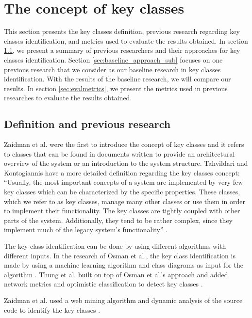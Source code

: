 \documentclass[runningheads]{comsis2}
\begin{document}
\section{The concept of key classes}
\label{sec:baseline_approach}

This section presents the key classes definition, previous research regarding key classes identification, and metrics used to evaluate the results obtained.
In section \ref{sec:keyclass_definition}, we present a summary of previous researchers and their approaches for key classes identification. Section \ref{sec:baseline_approach_sub} focuses on one previous research that we consider as our baseline research in key classes identification. With the results of the baseline research, we will compare our results. 
In section \ref{sec:evalmetrics}, we present the metrics used in previous researches to evaluate the results obtained. 


\subsection{Definition and previous research}
\label{sec:keyclass_definition}

Zaidman et al. \cite{ZaidmanJurnal} were the first to introduce the concept of key classes and it refers to classes that can be found in documents written to provide an architectural overview of the system or an introduction to the system structure.
Tahvildari and Kontogiannis have a more detailed definition regarding the key classes concept: “Usually, the most important concepts of a system are implemented by very few key classes which can be characterized by the specific properties. These classes, which we refer to as key classes, manage many other classes or use them in order to implement their functionality. The key classes are tightly coupled with other parts of the system. Additionally, they tend to be rather complex, since they implement much of the legacy system’s functionality” \cite{Tahvildari2004ImprovingDQ}.


The key class identification can be done by using different algorithms with different inputs. In the research of Osman et al., the key class identification is made by using a machine learning algorithm and class diagrams as input for the algorithm \cite{6676885}. Thung et al. built on top of Osman et al.’s approach and added network metrics and optimistic classification to detect key classes \cite{rocclasification}.

Zaidman et al. used a web mining algorithm and dynamic analysis of the source code to identify the key classes \cite{ZaidmanJurnal}.
\end{document}
